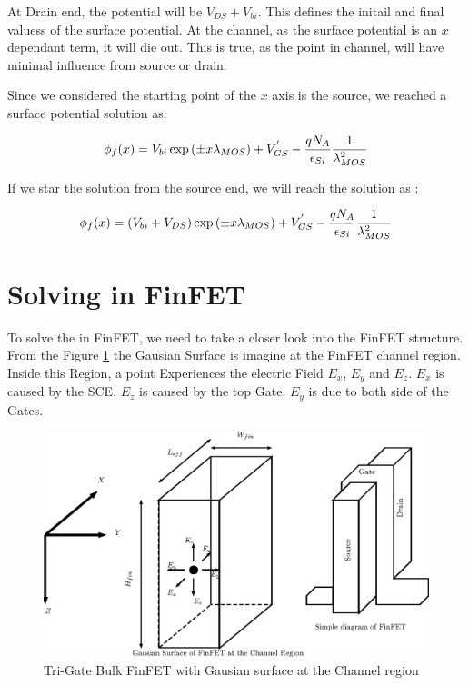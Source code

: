 \documentclass[a4paper]{article}
\begin{document}
At Drain end, the potential will be $V_{DS} + V_{bi}$. This defines the initail and final valuess of the surface potential. At the channel, as the surface potential is an $x$ dependant term, it will die out. This is true, as the point in channel, will have minimal influence from source or drain.

Since we considered the starting point of the $x$ axis is the source, we reached a surface potential solution as:

\begin{equation}
  \phi_f(x) = V_{bi} \exp \left({\pm x \lambda_{MOS}}\right) + V_{GS}^{'} - \frac{qN_A} {\epsilon_{Si}} \frac{1}{\lambda_{MOS}^2}
\end{equation}

If we star the solution from the source end, we will reach the solution as :

\begin{equation}
  \phi_f(x) = (V_{bi} + V_{DS}) \exp \left({\pm x \lambda_{MOS}}\right) + V_{GS}^{'} - \frac{qN_A} {\epsilon_{Si}} \frac{1}{\lambda_{MOS}^2}
\end{equation}


\section{Solving \PE in FinFET}

To solve the \PE in FinFET, we need to take a closer look into the FinFET structure. From the Figure \ref{fig:FinFET-E-Field} the Gausian Surface is imagine at the FinFET channel region. Inside this Region, a point Experiences the electric Field $E_x$, $E_y$ and $E_z$. $E_x$ is caused by the SCE. $E_z$ is caused by the top Gate. $E_y$ is due to both side of the Gates.

\begin{figure}[h!]
  \includegraphics[scale=0.8]{./FinFET-E-Field.eps}
  \caption{Tri-Gate Bulk FinFET with Gausian surface at the Channel region}
  \label{fig:FinFET-E-Field}
\end{figure}
\end{document}
